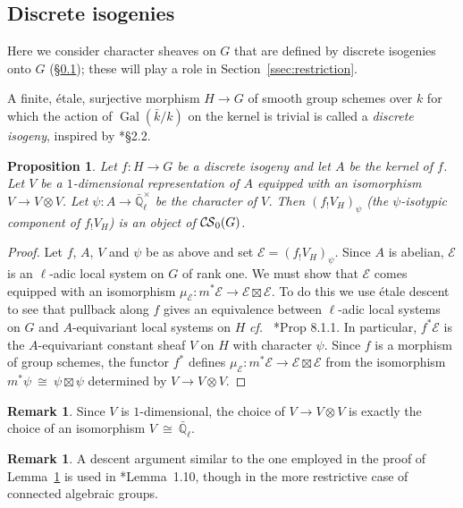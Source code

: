 \documentclass[10pt]{amsart}
\theoremstyle{plain}
\newtheorem{proposition}[theorem]{Proposition}
\theoremstyle{definition}
\newtheorem{remark}[theorem]{Remark}
\newcommand{\EE}{\mathbb{\bar Q}_\ell}
\newcommand{\bFq}{\bar{k}}
\newcommand{\Fq}{k}
\newcommand{\EEx}{\EE^\times}
\DeclareMathOperator{\Gal}{Gal}
\newcommand{\iso}{{\ \cong\ }}
\newcommand{\cs}[1]{{\mathcal{#1}}}
\newcommand{\CS}{{\mathcal{C\hskip-0.8pt S}}}
\newcommand{\bCS}{{\CS_0}}
\begin{document}
\subsection{Discrete isogenies}\label{ssec:discrete_isogenies}

Here we consider character sheaves on $G$ that are defined by discrete isogenies onto $G$
(\S \ref{ssec:discrete_isogenies}); these will play a role in Section~\ref{ssec:restriction}.

A finite, \'etale, surjective morphism $H\to G$ of smooth group schemes over $\Fq$ for which the action
of $\Gal(\bFq/\Fq)$ on the kernel is trivial is called a {\it discrete isogeny}, inspired by \cite{kamgarpour:09a}*{\S 2.2}.

\begin{proposition}\label{prop:finite}
Let $f: H \to G$ be a discrete isogeny and let $A$ be the kernel of $f$.
Let $V$ be a $1$-dimensional representation of $A$ 
equipped with an isomorphism $V\to V\otimes V$.
Let $\psi : A \to \EEx$ be the character of $V$.
Then $(f_! V_H)_\psi$ (the $\psi$-isotypic component of $f_!V_H$) is an object of $\bCS(G)$.
\end{proposition}

\begin{proof}
Let $f$, $A$, $V$ and $\psi$ be as above and set $\cs{E} = (f_! V_H)_\psi$.
Since $A$ is abelian, $\cs{E}$ is an $\ell$-adic local system on $G$ of rank one.
We must show that $\cs{E}$ comes equipped with an isomorphism $\mu_\cs{E} : m^* \cs{E} \to \cs{E}\boxtimes\cs{E}$.
To do this we use \'etale descent to see that pullback along $f$ gives an equivalence between $\ell$-adic local systems
on $G$ and $A$-equivariant local systems on $H$ {\it cf.\ } \cite{bernstein-luntz:equivariant_sheaves}*{Prop 8.1.1}. 
In particular, $f^*\cs{E}$ is the $A$-equivariant constant sheaf $V$ on $H$ with character $\psi$.
Since $f$ is a morphism of group schemes, the functor $f^*$ defines $\mu_\cs{E} : m^*\cs{E} \to \cs{E}\boxtimes\cs{E}$
from the isomorphism $m^*\psi \iso \psi \boxtimes\psi$ determined by $V\to V\otimes V$. 
\end{proof}

\begin{remark}
Since $V$ is $1$-dimensional, the choice of $V \to V\otimes V$ is exactly the choice of an isomorphism $V\iso \EE$.
\end{remark}

\begin{remark}
A descent argument similar to the one employed in the proof of Lemma~\ref{prop:finite} is used in
\cite{Drinfeld:math/0609769}*{Lemma~1.10}, though in the more restrictive case of connected algebraic groups.
\end{remark}
\end{document}
